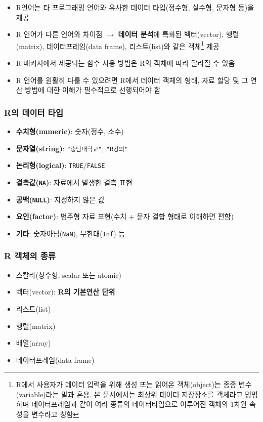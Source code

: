 \documentclass[
  11pt,
]{krantz}
\providecommand{\tightlist}{%
  \setlength{\itemsep}{0pt}\setlength{\parskip}{0pt}}
\begin{document}
\begin{itemize}
\tightlist
\item
  R언어는 타 프로그래밍 언어와 유사한 데이터 타입(정수형, 실수형, 문자형 등)을 제공
\item
  R 언어가 다른 언어와 차이점 \(\rightarrow\) \textbf{데이터 분석}에 특화된 벡터(vector), 행렬(matrix), 데이터프레임(data frame), 리스트(list)와 같은 객체\footnote{R에서 사용자가 데이터 입력을 위해 생성 또는 읽어온 객체(object)는 종종 변수(variable)라는 말과 혼용. 본 문서에서는 최상위 데이터 저장장소를 객체라고 명명하며 데이터프레임과 같이 여러 종류의 데이터타입으로 이루어진 객체의 1차원 속성을 변수라고 칭함} 제공
\item
  R 패키지에서 제공되는 함수 사용 방법은 R의 객체에 따라 달라질 수 있음\\
\item
  R 언어를 원활히 다룰 수 있으려면 R에서 데이터 객체의 형태, 자료 할당 및 그 연산 방법에 대한 이해가 필수적으로 선행되어야 함
\end{itemize}

\hypertarget{object-value}{%
\subsubsection*{R의 데이터 타입}\label{object-value}}


\begin{itemize}
\item
  \textbf{수치형(numeric)}: 숫자(정수, 소수)
\item
  \textbf{문자열(string)}: \texttt{"충남대학교"}, \texttt{"R강의"}
\item
  \textbf{논리형(logical)}: \texttt{TRUE}/\texttt{FALSE}
\item
  \textbf{결측값(\texttt{NA})}: 자료에서 발생한 결측 표현
\item
  \textbf{공백(\texttt{NULL})}: 지정하지 않은 값
\item
  \textbf{요인(factor)}: 범주형 자료 표현(수치 + 문자 결합 형태로 이해하면 편함)
\item
  \textbf{기타}: 숫자아님(\texttt{NaN}), 무한대(\texttt{Inf}) 등
\end{itemize}

\hypertarget{ch2-object-type}{%
\subsubsection*{R 객체의 종류}\label{ch2-object-type}}


\begin{itemize}
\tightlist
\item
  스칼라(상수형, scalar 또는 atomic)
\item
  벡터(vector): \textbf{R의 기본연산 단위}
\item
  리스트(list)
\item
  행렬(matrix)
\item
  배열(array)
\item
  데이터프레임(data frame)
\end{itemize}
\end{document}
